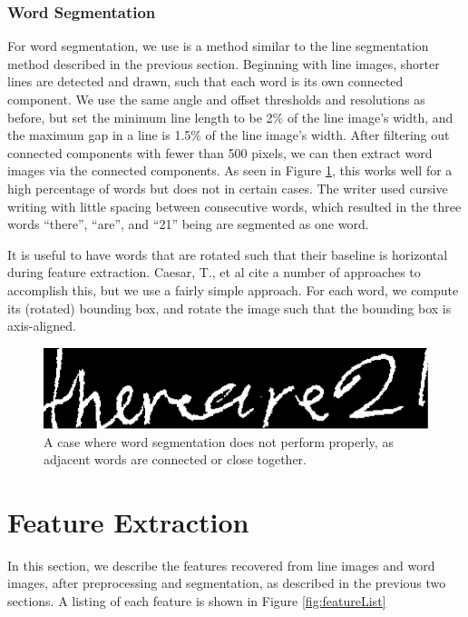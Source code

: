 \documentclass[paper=a4, fontsize=11pt]{scrartcl} %
\numberwithin{equation}{section} %
\numberwithin{figure}{section} %
\numberwithin{table}{section} %
\begin{document}
\subsubsection{Word Segmentation}
For word segmentation, we use is a method similar to the line
segmentation method described in the previous section. Beginning with
line images, shorter lines are detected and drawn, such that each word
is its own connected component. We use the same angle and offset
thresholds and resolutions as before, but set the minimum line length
to be 2\% of the line image's width, and the maximum gap in a line is
1.5\% of the line image's width. After filtering out connected
components with fewer than 500 pixels, we can then extract word images
via the connected components. As seen in Figure \ref{fig:wordfail},
this works well for a high percentage of words but does not in certain
cases. The writer used cursive writing with little spacing between
consecutive words, which resulted in the three words ``there'',
``are'', and ``21'' being are segmented as one word.


It is useful to have words that are rotated such that their baseline
is horizontal during feature extraction. Caesar, T., et al
\cite{Preprocessing} cite a number of approaches to accomplish this,
but we use a fairly simple approach. For each word, we compute its
(rotated) bounding box, and rotate the image such that the bounding
box is axis-aligned.

\begin{figure}
  \centering \includegraphics{wordfail.png}
  \caption{A case where word segmentation does not perform properly,
    as adjacent words are connected or close together.}
  \label{fig:wordfail}
\end{figure}


\section{Feature Extraction}
\label{sec:feature}
In this section, we describe the features recovered from line images
and word images, after preprocessing and segmentation, as described in
the previous two sections. A listing of each feature is shown in
Figure \ref{fig:featureList}
\end{document}
